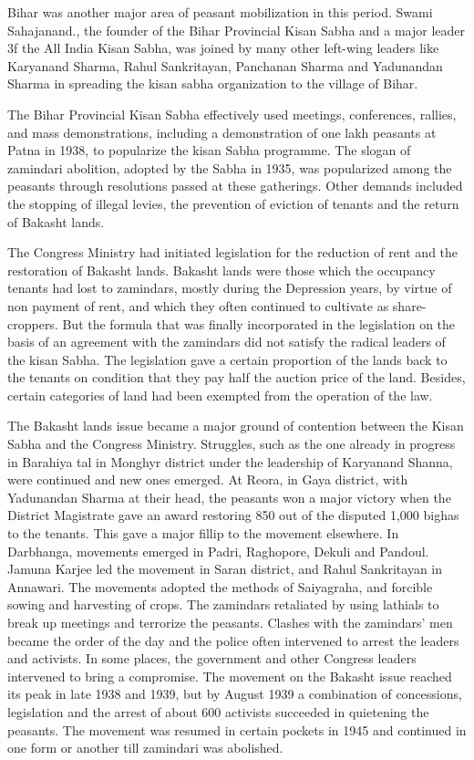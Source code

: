 Bihar was another major area of peasant mobilization in this period. Swami Sahajanand., the founder of the Bihar Provincial Kisan Sabha and a major leader 3f the All India Kisan Sabha, was joined by many other left-wing leaders like Karyanand Sharma, Rahul Sankritayan, Panchanan Sharma and Yadunandan Sharma in spreading the kisan sabha organization to the village of Bihar.

The Bihar Provincial Kisan Sabha effectively used meetings, conferences, rallies, and mass demonstrations, including a demonstration of one lakh peasants at Patna in 1938, to popularize the kisan Sabha programme. The slogan of zamindari abolition, adopted by the Sabha in 1935, was popularized among the peasants through resolutions passed at these gatherings. Other demands included the stopping of illegal levies, the prevention of eviction of tenants and the return of Bakasht lands.

The Congress Ministry had initiated legislation for the reduction of rent and the restoration of Bakasht lands. Bakasht lands were those which the occupancy tenants had lost to zamindars, mostly during the Depression years, by virtue of non­ payment of rent, and which they often continued to cultivate as share-croppers. But the formula that was finally incorporated in the legislation on the basis of an agreement with the zamindars did not satisfy the radical leaders of the kisan Sabha. The legislation gave a certain proportion of the lands back to the tenants on condition that they pay half the auction price of the land. Besides, certain categories of land had been exempted from the operation of the law.

The Bakasht lands issue became a major ground of contention between the Kisan Sabha and the Congress Ministry. Struggles, such as the one already in progress in Barahiya tal in Monghyr district under the leadership of Karyanand Shanna, were continued and new ones emerged. At Reora, in Gaya district, with Yadunandan Sharma at their head, the peasants won a major victory when the District Magistrate gave an award restoring 850 out of the disputed 1,000 bighas to the tenants. This gave a major fillip to the movement elsewhere. In Darbhanga, movements emerged in Padri, Raghopore, Dekuli and Pandoul. Jamuna Karjee led the movement in Saran district, and Rahul Sankritayan in Annawari. The movements adopted the methods of Saiyagraha, and forcible sowing and harvesting of crops. The zamindars retaliated by using lathials to break up meetings and terrorize the peasants. Clashes with the zamindars' men became the order of the day and the police often intervened to arrest the leaders and activists. In some places, the government and other Congress leaders intervened to bring a compromise. The movement on the Bakasht issue reached its peak in late 1938 and 1939, but by August 1939 a combination of concessions, legislation and the arrest of about 600 activists succeeded in quietening the peasants. The movement was resumed in certain pockets in 1945 and continued in one form or another till zamindari was abolished.

